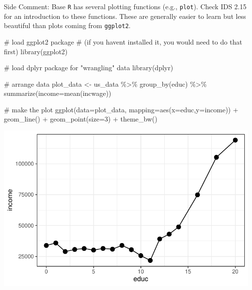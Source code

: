 \documentclass[
  letterpaper,
  DIV=11,
  numbers=noendperiod]{scrreprt}
\newenvironment{Shaded}{\begin{snugshade}}{\end{snugshade}}
\newcommand{\AttributeTok}[1]{\textcolor[rgb]{0.40,0.45,0.13}{#1}}
\newcommand{\CommentTok}[1]{\textcolor[rgb]{0.37,0.37,0.37}{#1}}
\newcommand{\DecValTok}[1]{\textcolor[rgb]{0.68,0.00,0.00}{#1}}
\newcommand{\FunctionTok}[1]{\textcolor[rgb]{0.28,0.35,0.67}{#1}}
\newcommand{\NormalTok}[1]{\textcolor[rgb]{0.00,0.23,0.31}{#1}}
\newcommand{\OtherTok}[1]{\textcolor[rgb]{0.00,0.23,0.31}{#1}}
\newcommand{\SpecialCharTok}[1]{\textcolor[rgb]{0.37,0.37,0.37}{#1}}
\begin{document}
{Side Comment:} Base \texttt{R} has several plotting functions (e.g.,
\texttt{plot}). Check IDS 2.15 for an introduction to these functions.
These are generally easier to learn but less beautiful than plots coming
from \texttt{ggplot2}.

\begin{Shaded}
\begin{Highlighting}[]
\CommentTok{\# load ggplot2 package }
\CommentTok{\# (if you haven\textquotesingle{}t installed it, you would need to do that first)}
\FunctionTok{library}\NormalTok{(ggplot2)}

\CommentTok{\# load dplyr package for "wrangling" data}
\FunctionTok{library}\NormalTok{(dplyr)}
\end{Highlighting}
\end{Shaded}

\begin{Shaded}
\begin{Highlighting}[]
\CommentTok{\# arrange data}
\NormalTok{plot\_data }\OtherTok{\textless{}{-}}\NormalTok{ us\_data }\SpecialCharTok{\%\textgreater{}\%}
    \FunctionTok{group\_by}\NormalTok{(educ) }\SpecialCharTok{\%\textgreater{}\%}
    \FunctionTok{summarize}\NormalTok{(}\AttributeTok{income=}\FunctionTok{mean}\NormalTok{(incwage))}

\CommentTok{\# make the plot}
\FunctionTok{ggplot}\NormalTok{(}\AttributeTok{data=}\NormalTok{plot\_data,}
       \AttributeTok{mapping=}\FunctionTok{aes}\NormalTok{(}\AttributeTok{x=}\NormalTok{educ,}\AttributeTok{y=}\NormalTok{income)) }\SpecialCharTok{+}
    \FunctionTok{geom\_line}\NormalTok{() }\SpecialCharTok{+} 
    \FunctionTok{geom\_point}\NormalTok{(}\AttributeTok{size=}\DecValTok{3}\NormalTok{) }\SpecialCharTok{+} 
    \FunctionTok{theme\_bw}\NormalTok{()}
\end{Highlighting}
\end{Shaded}

\includegraphics{04-expectations_files/figure-pdf/unnamed-chunk-5-1.pdf}
\end{document}
